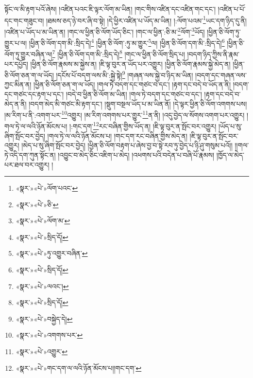 སྟོང་ལ་མི་རྟག་པའོ་ཞེས། །འཛིན་པའང་ཇི་ལྟར་ལོག་མ་ཡིན། །གང་གིས་འཛིན་དང་འཛིན་གང་དང་། །འཛིན་པ་པོ་དང་གང་གཟུང་བ། །ཐམས་ཅད་ཉེ་བར་ཞི་བ་སྟེ། །དེ་ཕྱིར་འཛིན་པ་ཡོད་མ་ཡིན། །:ལོག་པའམ་\footnote{«སྣར་»«པེ་»ལོག་པའང་}ཡང་དག་ཉིད་དུ་ནི། །འཛིན་པ་ཡོད་པ་མ་ཡིན་ན། །གང་ལ་ཕྱིན་ཅི་ལོག་ཡོད་ཅིང་། །གང་ལ་ཕྱིན་:ཅི་མ་\footnote{«སྣར་»«པེ་»ཅི་}ལོག་\footnote{«སྣར་»«པེ་»ལོག་མ་}ཡོད། །ཕྱིན་ཅི་ལོག་ཏུ་གྱུར་པ་ལ། །ཕྱིན་ཅི་ལོག་དག་མི་:སྲིད་དེ།\footnote{«སྣར་»«པེ་»སྲིད་དོ།} །ཕྱིན་ཅི་ལོག་:ཏུ་མ་གྱུར་\footnote{«སྣར་»«པེ་»ཏུ་འགྱུར་བཞིན་}ལ། །ཕྱིན་ཅི་ལོག་དག་མི་:སྲིད་དེ།\footnote{«སྣར་»«པེ་»སྲིད་དོ།} །ཕྱིན་ཅི་ལོག་ཏུ་གྱུར་བཞིན་ལ།\footnote{«སྣར་»«པེ་»ལའང་།} །ཕྱིན་ཅི་ལོག་དག་མི་:སྲིད་དེ།\footnote{«སྣར་»«པེ་»སྲིད་དོ།} །གང་ལ་ཕྱིན་ཅི་ལོག་སྲིད་པ། །བདག་ཉིད་ཀྱིས་ནི་རྣམ་པར་དཔྱོད། །ཕྱིན་ཅི་ལོག་རྣམས་མ་སྐྱེས་ན། །ཇི་ལྟ་བུར་ན་ཡོད་པར་འགྱུར། །ཕྱིན་ཅི་ལོག་རྣམས་སྐྱེ་མེད་ན། །ཕྱིན་ཅི་ལོག་ཅན་ག་ལ་ཡོད། །དངོས་པོ་བདག་ལས་མི་:སྐྱེ་སྟེ།\footnote{«སྣར་»«པེ་»བསྐྱེད་དེ།} །གཞན་ལས་སྐྱེ་བ་ཉིད་མ་ཡིན། །བདག་དང་གཞན་ལས་ཀྱང་མིན་ན། །ཕྱིན་ཅི་ལོག་ཅན་ག་ལ་ཡོད། །གལ་ཏེ་བདག་དང་གཙང་བ་དང་། །རྟག་དང་བདེ་བ་ཡོད་ན་ནི། །བདག་དང་གཙང་དང་རྟག་པ་དང་། །བདེ་བ་ཕྱིན་ཅི་ལོག་མ་ཡིན། །གལ་ཏེ་བདག་དང་གཙང་བ་དང་། །རྟག་དང་བདེ་བ་མེད་ན་ནི། །བདག་མེད་མི་གཙང་མི་རྟག་དང་། །སྡུག་བསྔལ་ཡོད་པ་མ་ཡིན་ནོ། །དེ་ལྟར་ཕྱིན་ཅི་ལོག་འགགས་པས། །མ་རིག་པ་ནི་:འགག་པར་\footnote{«སྣར་»«པེ་»འགགས་པར་}འགྱུར། །མ་རིག་འགགས་པར་གྱུར་\footnote{«སྣར་»«པེ་»འགྱུར་}ན་ནི། །འདུ་བྱེད་ལ་སོགས་འགག་པར་འགྱུར། །གལ་ཏེ་ལ་ལའི་ཉོན་མོངས་པ། །:གང་དག་\footnote{«སྣར་»«པེ་»གང་དག་ལ་ལའི་ཉོན་མོངས་པ།།གང་དག་}རང་བཞིན་གྱིས་ཡོད་ན། །ཇི་ལྟ་བུར་ན་སྤོང་བར་འགྱུར། །ཡོད་པ་སུ་ཞིག་སྤོང་བར་བྱེད། །གལ་ཏེ་ལ་ལའི་ཉོན་མོངས་པ། །གང་དག་རང་བཞིན་གྱིས་མེད་ན། །ཇི་ལྟ་བུར་ན་སྤོང་བར་འགྱུར། །མེད་པ་སུ་ཞིག་སྤོང་བར་བྱེད། །ཕྱིན་ཅི་ལོག་བརྟག་པ་ཞེས་བྱ་བ་སྟེ་རབ་ཏུ་བྱེད་པ་ཉི་ཤུ་གསུམ་པའོ།། །།གལ་ཏེ་འདི་དག་ཀུན་སྟོང་ན། །འབྱུང་བ་མེད་ཅིང་འཇིག་པ་མེད། །འཕགས་པའི་བདེན་པ་བཞི་པོ་རྣམས། །ཁྱོད་ལ་མེད་པར་ཐལ་བར་འགྱུར། །
